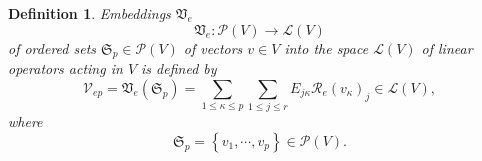 \documentclass[aps,preprint]{revtex4}%
\newtheorem{definition}[theorem]{Definition}
\begin{document}
\begin{definition}
Embeddings $\mathfrak{V}_{e}$
\begin{equation}
\mathfrak{V}_{e}:\mathcal{P}\left(  V\right)  \rightarrow\mathcal{L}\left(
V\right)
\end{equation}
of \emph{ordered sets} $\mathfrak{S}_{p}\in\mathcal{P}\left(  V\right)  $ of
vectors $v\in V$ into the space $\mathcal{L}\left(  V\right)  $ of linear
operators acting in $V$ is defined by
\begin{equation}
\mathcal{V}_{ep}=\mathfrak{V}_{e}\left(  \mathfrak{S}_{p}\right)  =\sum
_{1\leq\kappa\leq p}\sum_{1\leq j\leq r}E_{j\kappa}\mathcal{R}_{e}\left(
v_{\kappa}\right)  _{j}\in\mathcal{L}\left(  V\right)  ,
\end{equation}
where
\begin{equation}
\mathfrak{S}_{p}=\left\{  v_{1},\cdots,v_{p}\right\}  \in\mathcal{P}\left(
V\right)  .
\end{equation}

\end{definition}
\end{document}
